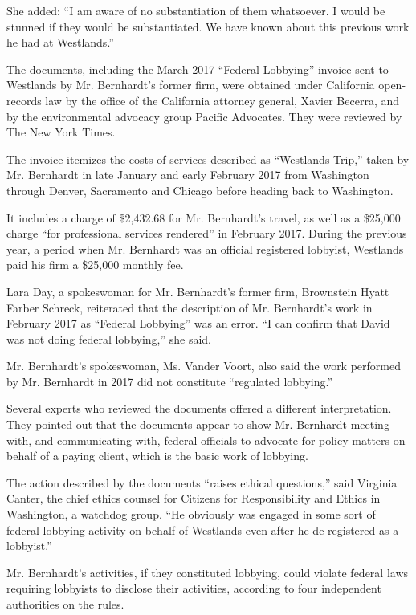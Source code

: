 She added: ``I am aware of no substantiation of them whatsoever. I would
be stunned if they would be substantiated. We have known about this
previous work he had at Westlands.''

The documents, including the March 2017 ``Federal Lobbying'' invoice
sent to Westlands by Mr. Bernhardt's former firm, were obtained under
California open-records law by the office of the California attorney
general, Xavier Becerra, and by the environmental advocacy group Pacific
Advocates. They were reviewed by The New York Times.

The invoice itemizes the costs of services described as ``Westlands
Trip,'' taken by Mr. Bernhardt in late January and early February 2017
from Washington through Denver, Sacramento and Chicago before heading
back to Washington.

It includes a charge of \$2,432.68 for Mr. Bernhardt's travel, as well
as a \$25,000 charge ``for professional services rendered'' in February
2017. During the previous year, a period when Mr. Bernhardt was an
official registered lobbyist, Westlands paid his firm a \$25,000 monthly
fee.

Lara Day, a spokeswoman for Mr. Bernhardt's former firm, Brownstein
Hyatt Farber Schreck, reiterated that the description of Mr. Bernhardt's
work in February 2017 as ``Federal Lobbying'' was an error. ``I can
confirm that David was not doing federal lobbying,'' she said.

Mr. Bernhardt's spokeswoman, Ms. Vander Voort, also said the work
performed by Mr. Bernhardt in 2017 did not constitute ``regulated
lobbying.''

Several experts who reviewed the documents offered a different
interpretation. They pointed out that the documents appear to show Mr.
Bernhardt meeting with, and communicating with, federal officials to
advocate for policy matters on behalf of a paying client, which is the
basic work of lobbying.

The action described by the documents ``raises ethical questions,'' said
Virginia Canter, the chief ethics counsel for Citizens for
Responsibility and Ethics in Washington, a watchdog group. ``He
obviously was engaged in some sort of federal lobbying activity on
behalf of Westlands even after he de-registered as a lobbyist.''

Mr. Bernhardt's activities, if they constituted lobbying, could violate
federal laws requiring lobbyists to disclose their activities, according
to four independent authorities on the rules.


